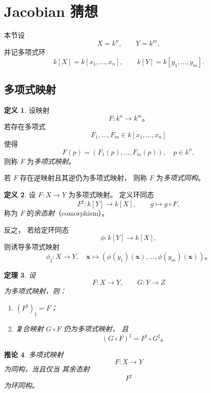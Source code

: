 \documentclass[11pt]{article}
\theoremstyle{plain}
\newtheorem{theorem}{定理}[section]
\newtheorem{corollary}[theorem]{推论}
\theoremstyle{definition}
\newtheorem{definition}[theorem]{定义}
\theoremstyle{remark}
\begin{document}
\newpage
\section{Jacobian 猜想}

本节设
\[
    X=k^n,\qquad Y=k^m,
\]
并记多项式环
\[
    k[X]=k[x_1,\dots,x_n],\qquad
    k[Y]=k[y_1,\dots,y_m].
\]

\subsection{多项式映射}

\begin{definition}
    设映射
    \[
        F:k^n\to k^m。
    \]
    若存在多项式
    \[
        F_1,\dots,F_m\in k[x_1,\dots,x_n]
    \]
    使得
    \[
        F(p)=(F_1(p),\dots,F_m(p)),
        \quad p\in k^n,
    \]
    则称 $F$ 为\emph{多项式映射}。

    若 $F$ 存在逆映射且其逆仍为多项式映射，
    则称 $F$ 为\emph{多项式同构}。
\end{definition}

\begin{definition}
    设 $F:X\to Y$ 为多项式映射。
    定义环同态
    \[
        F^\sharp:k[Y]\longrightarrow k[X],
        \qquad
        g\mapsto g\circ F,
    \]
    称为 $F$ 的\emph{余态射}（comorphism）。

    反之，
    若给定环同态
    \[
        \phi:k[Y]\to k[X],
    \]
    则诱导多项式映射
    \[
        \phi_\sharp:X\to Y,
        \quad
        \mathbf{x}\mapsto
        (\phi(y_1)(\mathbf{x}),\dots,\phi(y_m)(\mathbf{x}))。
    \]
\end{definition}


\begin{theorem}
    设
    \[
        F:X\to Y,\qquad
        G:Y\to Z
    \]
    为多项式映射，则：

    \begin{enumerate}
        \item
              $(F^\sharp)_\sharp=F$；

        \item
              复合映射 $G\circ F$ 仍为多项式映射，
              且
              \[
                  (G\circ F)^\sharp
                  =
                  F^\sharp\circ G^\sharp。
              \]
    \end{enumerate}
\end{theorem}

\begin{corollary}
    多项式映射
    \[
        F:X\to Y
    \]
    为同构，当且仅当
    其余态射
    \[
        F^\sharp
    \]
    为环同构。
\end{corollary}
\end{document}
